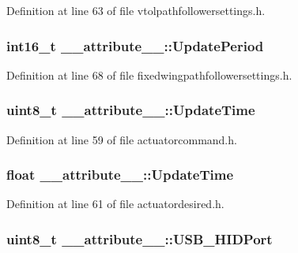 \-Definition at line 63 of file vtolpathfollowersettings.\-h.

\hypertarget{struct____attribute_____ac6d645f026cb0ebc6f93412a8a453186}{
\subsubsection[{\-Update\-Period}]{\setlength{\rightskip}{0pt plus 5cm}int16\-\_\-t {\bf \-\_\-\-\_\-attribute\-\_\-\-\_\-\-::\-Update\-Period}}}\label{struct____attribute_____ac6d645f026cb0ebc6f93412a8a453186}


\-Definition at line 68 of file fixedwingpathfollowersettings.\-h.

\hypertarget{struct____attribute_____ac93c8162cd35ab48bda14023b4505cfe}{
\subsubsection[{\-Update\-Time}]{\setlength{\rightskip}{0pt plus 5cm}uint8\-\_\-t {\bf \-\_\-\-\_\-attribute\-\_\-\-\_\-\-::\-Update\-Time}}}\label{struct____attribute_____ac93c8162cd35ab48bda14023b4505cfe}


\-Definition at line 59 of file actuatorcommand.\-h.

\hypertarget{struct____attribute_____af84ecd51fe6dbc0d88d848da3d039a98}{
\subsubsection[{\-Update\-Time}]{\setlength{\rightskip}{0pt plus 5cm}float {\bf \-\_\-\-\_\-attribute\-\_\-\-\_\-\-::\-Update\-Time}}}\label{struct____attribute_____af84ecd51fe6dbc0d88d848da3d039a98}


\-Definition at line 61 of file actuatordesired.\-h.

\hypertarget{struct____attribute_____a9b0a9a5fe67d353c722fbf6354a6fbd6}{
\subsubsection[{\-U\-S\-B\-\_\-\-H\-I\-D\-Port}]{\setlength{\rightskip}{0pt plus 5cm}uint8\-\_\-t {\bf \-\_\-\-\_\-attribute\-\_\-\-\_\-\-::\-U\-S\-B\-\_\-\-H\-I\-D\-Port}}}\label{struct____attribute_____a9b0a9a5fe67d353c722fbf6354a6fbd6}


